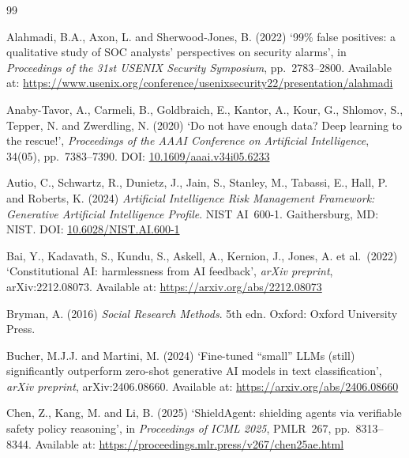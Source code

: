 \documentclass[12pt,a4paper]{article}
\begin{document}
\newpage
\begin{thebibliography}{99}

Alahmadi, B.A., Axon, L. and Sherwood-Jones, B. (2022)
`99\% false positives: a qualitative study of SOC analysts' perspectives on
security alarms',
in \textit{Proceedings of the 31st USENIX Security Symposium}, pp.~2783--2800.
Available at: \url{https://www.usenix.org/conference/usenixsecurity22/presentation/alahmadi}

Anaby-Tavor, A., Carmeli, B., Goldbraich, E., Kantor, A., Kour, G.,
Shlomov, S., Tepper, N. and Zwerdling, N. (2020)
`Do not have enough data? Deep learning to the rescue!',
\textit{Proceedings of the AAAI Conference on Artificial Intelligence},
34(05), pp.~7383--7390.
DOI: \href{https://doi.org/10.1609/aaai.v34i05.6233}{10.1609/aaai.v34i05.6233}

Autio, C., Schwartz, R., Dunietz, J., Jain, S., Stanley, M., Tabassi, E.,
Hall, P. and Roberts, K. (2024)
\textit{Artificial Intelligence Risk Management Framework: Generative Artificial
Intelligence Profile}. NIST AI~600-1. Gaithersburg, MD: NIST.
DOI: \href{https://doi.org/10.6028/NIST.AI.600-1}{10.6028/NIST.AI.600-1}

Bai, Y., Kadavath, S., Kundu, S., Askell, A., Kernion, J., Jones, A. et al.\ (2022)
`Constitutional AI: harmlessness from AI feedback',
\textit{arXiv preprint}, arXiv:2212.08073.
Available at: \url{https://arxiv.org/abs/2212.08073}

Bryman, A. (2016)
\textit{Social Research Methods}. 5th edn. Oxford: Oxford University Press.

Bucher, M.J.J. and Martini, M. (2024)
`Fine-tuned ``small'' LLMs (still) significantly outperform zero-shot generative
AI models in text classification',
\textit{arXiv preprint}, arXiv:2406.08660.
Available at: \url{https://arxiv.org/abs/2406.08660}

Chen, Z., Kang, M. and Li, B. (2025)
`ShieldAgent: shielding agents via verifiable safety policy reasoning',
in \textit{Proceedings of ICML 2025}, PMLR~267, pp.~8313--8344.
Available at: \url{https://proceedings.mlr.press/v267/chen25ae.html}


\end{thebibliography}
\end{document}
